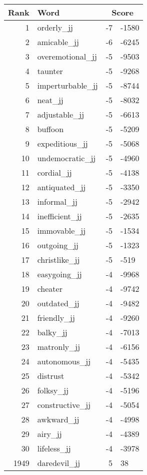 \begin{longtable}[!htbp]{| rlr@{.}l |}
    \hline
    \textbf{Rank} & \textbf{Word} & \multicolumn{2}{c|}{\textbf{Score}} \\
    \hline
    \endhead
    1 & orderly\_jj & -7 & -1580 \\
    2 & amicable\_jj & -6 & -6245 \\
    3 & overemotional\_jj & -5 & -9503 \\
    4 & taunter & -5 & -9268 \\
    5 & imperturbable\_jj & -5 & -8744 \\
    6 & neat\_jj & -5 & -8032 \\
    7 & adjustable\_jj & -5 & -6613 \\
    8 & buffoon & -5 & -5209 \\
    9 & expeditious\_jj & -5 & -5068 \\
    10 & undemocratic\_jj & -5 & -4960 \\
    11 & cordial\_jj & -5 & -4138 \\
    12 & antiquated\_jj & -5 & -3350 \\
    13 & informal\_jj & -5 & -2942 \\
    14 & inefficient\_jj & -5 & -2635 \\
    15 & immovable\_jj & -5 & -1534 \\
    16 & outgoing\_jj & -5 & -1323 \\
    17 & christlike\_jj & -5 & -519 \\
    18 & easygoing\_jj & -4 & -9968 \\
    19 & cheater & -4 & -9742 \\
    20 & outdated\_jj & -4 & -9482 \\
    21 & friendly\_jj & -4 & -9260 \\
    22 & balky\_jj & -4 & -7013 \\
    23 & matronly\_jj & -4 & -6156 \\
    24 & autonomous\_jj & -4 & -5435 \\
    25 & distrust & -4 & -5342 \\
    26 & folksy\_jj & -4 & -5196 \\
    27 & constructive\_jj & -4 & -5054 \\
    28 & awkward\_jj & -4 & -4998 \\
    29 & airy\_jj & -4 & -4389 \\
    30 & lifeless\_jj & -4 & -3978 \\
    1949 & daredevil\_jj & 5 & 38 \\

\end{longtable}

